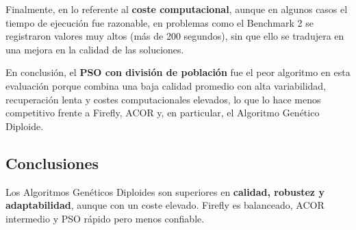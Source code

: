 \documentclass[10pt,twocolumn]{article}
\begin{document}
Finalmente, en lo referente al \textbf{coste computacional}, aunque en algunos casos el tiempo de ejecución fue razonable, en problemas como el Benchmark 2 se registraron valores muy altos (más de 200 segundos), sin que ello se tradujera en una mejora en la calidad de las soluciones.

En conclusión, el \textbf{PSO con división de población} fue el peor algoritmo en esta evaluación porque combina una baja calidad promedio con alta variabilidad, recuperación lenta y costes computacionales elevados, lo que lo hace menos competitivo frente a Firefly, ACOR y, en particular, el Algoritmo Genético Diploide.



\subsection*{Conclusiones}

Los Algoritmos Genéticos Diploides son superiores en \textbf{calidad, robustez y adaptabilidad}, aunque con un coste elevado. Firefly es balanceado, ACOR intermedio y PSO rápido pero menos confiable.
\end{document}
